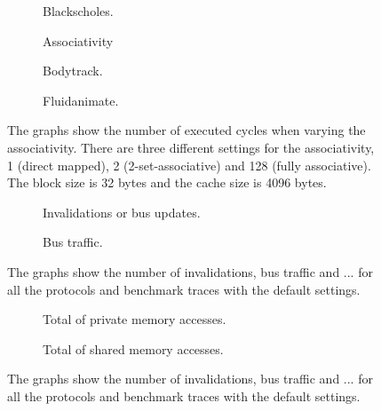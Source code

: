 \begin{figure}[H]
    \centering
    \begin{subfigure}[b]{0.33\textwidth}
        \centering
        \caption{Blackscholes.}\label{fig:associativity_blackscholes_advanced}
    \end{subfigure}%
    \hfill
    \begin{subfigure}[b]{0.33\textwidth}
        \centering
        Associativity\par\medskip
        \caption{Bodytrack.}\label{fig:associativity_bodytrack_advanced}
    \end{subfigure}%
    \hfill
    \begin{subfigure}[b]{0.33\textwidth}
        \centering
        \caption{Fluidanimate.}\label{fig:associativity_fluidanimate_advanced}
    \end{subfigure}
    \hfill
    \caption{The graphs show the number of executed cycles when varying the associativity. There are three different settings for the associativity, 1 (direct mapped), 2 (2-set-associative) and 128 (fully associative). The block size is 32 bytes and the cache size is 4096 bytes.}\label{fig:associativity_advanced}
\end{figure}

\begin{figure}[H]
    \centering
    \begin{subfigure}[b]{0.5\textwidth}
        \centering
        \caption{Invalidations or bus updates.}\label{fig:invalidations_advanced}
    \end{subfigure}%
    \hfill
    \begin{subfigure}[b]{0.5\textwidth}
        \centering
        \caption{Bus traffic.}\label{fig:bus_traffic_advanced}
    \end{subfigure}%
    \hfill
    \caption{The graphs show the number of invalidations, bus traffic and ... for all the protocols and benchmark traces with the default settings.}\label{fig:inv_bus_advanced}
\end{figure}

\begin{figure}[H]
    \centering
    \begin{subfigure}[b]{0.5\textwidth}
        \centering
        \caption{Total of private memory accesses.}\label{fig:total_private_accesses_advanced}
    \end{subfigure}%
    \hfill
    \begin{subfigure}[b]{0.5\textwidth}
        \centering
        \caption{Total of shared memory accesses.}\label{fig:total_shared_accesses_advanced}
    \end{subfigure}%
    \hfill
    \caption{The graphs show the number of invalidations, bus traffic and ... for all the protocols and benchmark traces with the default settings.}\label{fig:accesses_advanced}
\end{figure}
